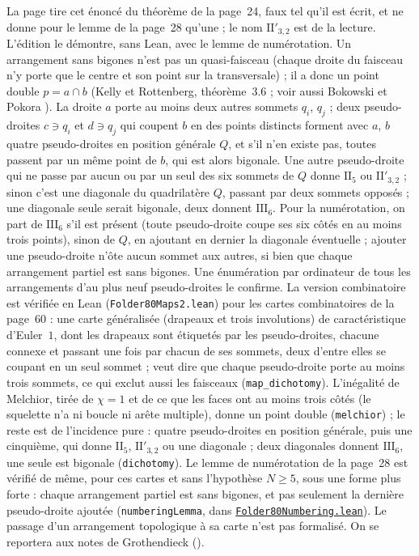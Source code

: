 {\small La page tire cet énoncé du théorème de la page~24, faux tel qu'il est écrit, et ne donne pour le lemme de la page~28 qu'une  ; le nom $\mathrm{II}'_{3,2}$ est de la lecture. L'édition le démontre, sans Lean, avec le lemme de numérotation. Un arrangement sans bigones n'est pas un quasi-faisceau (chaque droite du faisceau n'y porte que le centre et son point sur la transversale) ; il a donc un point double $p = a \cap b$ (Kelly et Rottenberg, théorème~3.6 \cite{kellyrottenberg1972} ; voir aussi Bokowski et Pokora \cite{bokowskipokora2018}). La droite $a$ porte au moins deux autres sommets $q_i$, $q_j$ ; deux pseudo-droites $c \ni q_i$ et $d \ni q_j$ qui coupent $b$ en des points distincts forment avec $a$, $b$ quatre pseudo-droites en position générale $Q$, et s'il n'en existe pas, toutes passent par un même point de $b$, qui est alors bigonale. Une autre pseudo-droite qui ne passe par aucun ou par un seul des six sommets de $Q$ donne $\mathrm{II}_5$ ou $\mathrm{II}'_{3,2}$ ; sinon c'est une diagonale du quadrilatère $Q$, passant par deux sommets opposés ; une diagonale seule serait bigonale, deux donnent $\mathrm{III}_6$. Pour la numérotation, on part de $\mathrm{III}_6$ s'il est présent (toute pseudo-droite coupe ses six côtés en au moins trois points), sinon de $Q$, en ajoutant en dernier la diagonale éventuelle ; ajouter une pseudo-droite n'ôte aucun sommet aux autres, si bien que chaque arrangement partiel est sans bigones. Une énumération par ordinateur de tous les arrangements d'au plus neuf pseudo-droites le confirme. La version combinatoire est vérifiée en Lean (\texttt{Folder80Maps2.lean}) pour les cartes combinatoires de la page~60 : une carte généralisée (drapeaux et trois involutions) de caractéristique d'Euler~$1$, dont les drapeaux sont étiquetés par les pseudo-droites, chacune connexe et passant une fois par chacun de ses sommets, deux d'entre elles se coupant en un seul sommet ;  veut dire que chaque pseudo-droite porte au moins trois sommets, ce qui exclut aussi les faisceaux (\texttt{map\_dichotomy}). L'inégalité de Melchior, tirée de $\chi = 1$ et de ce que les faces ont au moins trois côtés (le squelette n'a ni boucle ni arête multiple), donne un point double (\texttt{melchior}) ; le reste est de l'incidence pure : quatre pseudo-droites en position générale, puis une cinquième, qui donne $\mathrm{II}_5$, $\mathrm{II}'_{3,2}$ ou une diagonale ; deux diagonales donnent $\mathrm{III}_6$, une seule est bigonale (\texttt{dichotomy}). Le lemme de numérotation de la page~28 est vérifié de même, pour ces cartes et sans l'hypothèse $N \geq 5$, sous une forme plus forte : chaque arrangement partiel est sans bigones, et pas seulement la dernière pseudo-droite ajoutée (\texttt{numberingLemma}, dans \href{\leanblobmain/Combinatorics/Folder80Numbering.lean}{\texttt{Folder80Numbering.\allowbreak{}lean}}). Le passage d'un arrangement topologique à sa carte n'est pas formalisé. On se reportera aux notes de Grothendieck ().\par}

